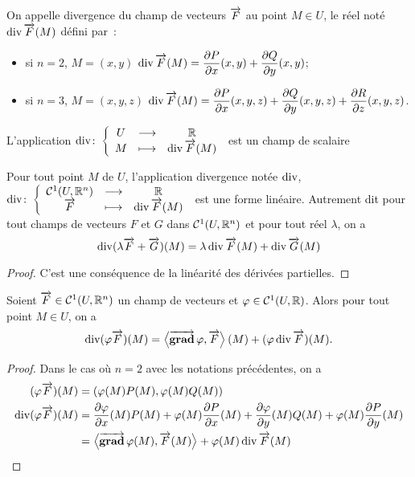 \begin{defdef}
  On appelle divergence du champ de vecteurs \(\overrightarrow{F}\) au point \(M \in U\), 
  le réel noté \(\operatorname{div} \overrightarrow{F}(M)\) défini par~:
  \begin{itemize}
    \item si \(n=2\), \(M=(x,y)\) \(\operatorname{div} \overrightarrow{F}(M)=\dfrac{\partial{} P}{\partial{} x}(x,y) + 
      \dfrac{\partial{} Q}{\partial{} y}(x,y)\);
    \item si \(n=3\), \(M=(x,y,z)\) \(\operatorname{div} \overrightarrow{F}(M)=\dfrac{\partial{} P}{\partial{} x}(x,y,z) + 
      \dfrac{\partial{} Q}{\partial{} y}(x,y,z) + \dfrac{\partial{} R}{\partial{} z}(x,y,z)\).
  \end{itemize}
  L'application \(\operatorname{div}\colon\left\{\begin{array}{ccc}U & \longrightarrow &\mathbb{R}\\M & \longmapsto & \operatorname{div} \overrightarrow{F}(M)\end{array}\right.\) est un champ 
  de scalaire
\end{defdef}
%
\begin{prop}
  Pour tout point \(M\) de \(U\), l'application divergence notée \(\operatorname{div}\), 
  \(\operatorname{div}\colon\left\{\begin{array}{ccc}\mathcal{C}^{1}(U, \mathbb{R}^n) & \longrightarrow &\mathbb{R}\\\overrightarrow{F} & \longmapsto & \operatorname{div}\overrightarrow{F}(M)\end{array}\right.\) 
  est une forme linéaire. Autrement dit pour tout champs de vecteurs \(F\) et 
  \(G\) dans \(\mathcal{C}^{1}(U, \mathbb{R}^n)\) et pour tout réel \(\lambda\), on a
  \begin{equation}
    \operatorname{div}(\lambda \overrightarrow{F} + \overrightarrow{G})(M) = \lambda \operatorname{div} \overrightarrow{F}(M) + \operatorname{div} 
    \overrightarrow{G}(M)
  \end{equation}
\end{prop}
\begin{proof}
  C'est une conséquence de la linéarité des dérivées partielles.
\end{proof}
%
\begin{prop}
  Soient \(\overrightarrow{F} \in \mathcal{C}^{1}(U, \mathbb{R}^n)\) un champ de vecteurs et \(\varphi 
  \in \mathcal{C}^{1}(U, \mathbb{R})\). Alors pour tout point \(M \in U\), on a
  \begin{equation}
    \operatorname{div}(\varphi \overrightarrow{F})(M)=\left\langle{\operatorname{\overrightarrow{\mathbf{grad}}}{\varphi}},{\overrightarrow{F}}\right\rangle(M) + 
    (\varphi \operatorname{div} \overrightarrow{F})(M).
  \end{equation}
\end{prop}
\begin{proof}
  Dans le cas où \(n=2\) avec les notations précédentes, on a
  \begin{align}
    (\varphi \overrightarrow{F})(M)& = (\varphi(M) P(M), \varphi(M) Q(M)) \\
    \operatorname{div}(\varphi \overrightarrow{F})(M)& = \dfrac{\partial{} \varphi}{\partial{} x}(M)  P(M) + \varphi(M) 
    \dfrac{\partial{} P}{\partial{} x}(M) + \dfrac{\partial{} \varphi}{\partial{} y}(M)  Q(M) + \varphi(M) 
    \dfrac{\partial{} P}{\partial{} y}(M) \\
    &=\left\langle{\operatorname{\overrightarrow{\mathbf{grad}}}{\varphi}(M)},{\overrightarrow{F}(M)}\right\rangle + \varphi(M)\operatorname{div}\overrightarrow{F}(M)
  \end{align}
\end{proof}

